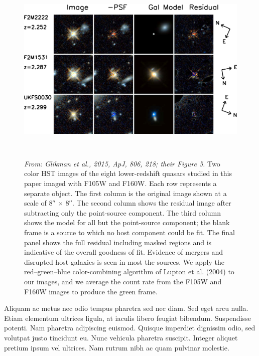\documentclass[11pt,epsf]{article}
\begin{document}
\begin{figure}[h]
  \begin{center}
   \hspace{-0.5cm}
    \includegraphics[height=8.5cm,width=16.2cm]
   {figs/Glikman_2015_ApJ_806_218_Fig5_hr.jpg}
   \caption{     \footnotesize
     {\it From: Glikman et al., 2015, ApJ, 806, 218; their Figure 5.}
     Two color HST images of the eight lower-redshift quasars studied in
     this paper imaged with F105W and F160W. Each row represents a separate
     object. The first column is the original image shown at a scale of 8′′
     × 8′′. The second column shows the residual image after subtracting
     only the point-source component. The third column shows the model for
     all but the point-source component; the blank frame is a source to
     which no host component could be fit. The final panel shows the full
     residual including masked regions and is indicative of the overall
     goodness of fit. Evidence of mergers and disrupted host galaxies is
     seen in most the sources. We apply the red–green–blue color-combining
     algorithm of Lupton et al. (2004) to our images, and we average the
     count rate from the F105W and F160W images to produce the green frame.
}
  \vspace{-14pt}
 \label{figtest-fig}
\end{center}
\end{figure}

\smallskip
\smallskip
\noindent
Aliquam ac metus nec odio tempus pharetra sed nec diam. Sed eget arcu
nulla. Etiam elementum ultrices ligula, at iaculis libero feugiat
bibendum. Suspendisse potenti. Nam pharetra adipiscing
euismod. Quisque imperdiet dignissim odio, sed volutpat justo
tincidunt eu. Nunc vehicula pharetra suscipit. Integer aliquet pretium
ipsum vel ultrices. Nam rutrum nibh ac quam pulvinar molestie.
\end{document}
